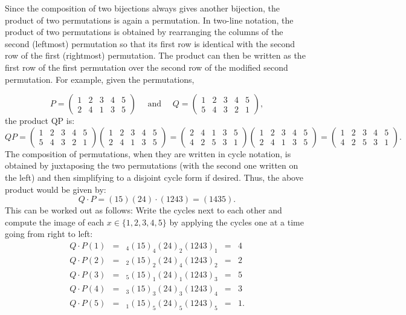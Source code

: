Since the composition of two bijections always gives another bijection, the product of two permutations is
again a permutation. In two-line notation, the product of two permutations is obtained by rearranging the
columns of the second (leftmost) permutation so that its first row is identical with the second row of the
first (rightmost) permutation. The product can then be written as the first row of the first permutation over
the second row of the modified second permutation. For example, given the permutations,

$$P=
    \begin{pmatrix}1&2&3&4&5\\2&4&1&3&5\end{pmatrix}\quad {\text{ and }}\quad
    Q={\begin{pmatrix}1&2&3&4&5\\5&4&3&2&1\end{pmatrix}},
$$
the product QP is:
$$
    QP=
    \begin{pmatrix}
        1&2&3&4&5\\5&4&3&2&1\end{pmatrix}{\begin{pmatrix}1 & 2 & 3 & 4 & 5 \\2&4&1&3&5
    \end{pmatrix}}
    =
    \begin{pmatrix}2&4&1&3&5\\4&2&5&3&1\end{pmatrix}
    \begin{pmatrix}1&2&3&4&5\\2&4&1&3&5\end{pmatrix}
    =
    \begin{pmatrix}1&2&3&4&5\\4&2&5&3&1\end{pmatrix}.
$$
The composition of permutations, when they are written in cycle notation, is obtained by juxtaposing the two
permutations (with the second one written on the left) and then simplifying to a disjoint cycle form if desired.
Thus, the above product would be given by:
$$Q\cdot P=(15)(24)\cdot (1243)=(1435).$$
This can be worked out as follows: Write the cycles next to each other and compute the image of
each $x\in\{1,2,3,4,5\}$ by applying the cycles one at a time going from right to left:
$$
    \begin{array}{lllll}
        Q\cdot P(1) & = & _4(15)_4(24)_2(1243)_1 & = & 4  \\
        Q\cdot P(2) & = & _2(15)_2(24)_4(1243)_2 & = & 2  \\
        Q\cdot P(3) & = & _5(15)_1(24)_1(1243)_3 & = & 5  \\
        Q\cdot P(4) & = & _3(15)_3(24)_3(1243)_4 & = & 3  \\
        Q\cdot P(5) & = & _1(15)_5(24)_5(1243)_5 & = & 1.
    \end{array}
$$
